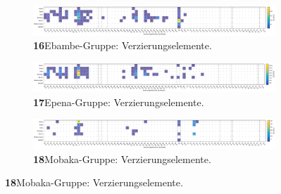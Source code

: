 \addtocounter{figure}{-1}
\begin{figure}

\begin{subfigure}{\textwidth}
	\setcounter{subfigure}{15}
	\centering
	\includegraphics[width=\textwidth]{fig/EBA_Verzierungselmente.pdf}
	\caption*{\textbf{16}\hspace{1em}Ebambe-Gruppe: Verzierungselemente. \vspace{\baselineskip}}
	\label{fig:EBA_Verz}
\end{subfigure}

\begin{subfigure}{\textwidth}
	\centering
	\includegraphics[width=\textwidth]{fig/EPE_Verzierungselmente.pdf}
	\caption*{\textbf{17}\hspace{1em}Epena-Gruppe: Verzierungselemente. \vspace{\baselineskip}}
	\label{fig:EPE_Verz}
\end{subfigure}

\begin{subfigure}{\textwidth}
	\centering
	\includegraphics[width=\textwidth]{fig/MKA_Verzierungselmente.pdf}
	\caption*{\textbf{18}\hspace{1em}Mobaka-Gruppe: Verzierungselemente. \vspace{\baselineskip}}
	\label{fig:MKA_Verz}
\end{subfigure}
\end{figure}

